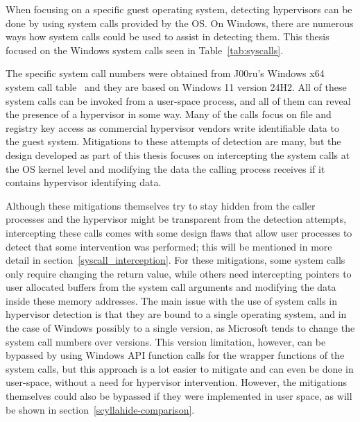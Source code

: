 When focusing on a specific guest operating system, detecting hypervisors can be done by using system calls provided by the OS. 
On Windows, there are numerous ways how system calls could be used to assist in detecting them. This thesis focused on the Windows system calls seen in Table~\ref{tab:syscalls}. 

The specific system call numbers were obtained from J00ru's Windows x64 system call table~\cite{j00ruSyscalls} and they are based on Windows 11 version 24H2. All of these system calls can be invoked from a user-space process, and all of them can reveal the presence of a hypervisor in some way. 
Many of the calls focus on file and registry key access as commercial hypervisor vendors write identifiable data to the guest system. 
Mitigations to these attempts of detection are many, but the design developed as part of this thesis focuses on intercepting the system calls at the OS kernel level 
and modifying the data the calling process receives if it contains hypervisor identifying data.

Although these mitigations themselves try to stay hidden from the caller processes and the hypervisor might be transparent from the detection attempts, intercepting these calls comes with some design flaws that allow user processes to detect that
some intervention was performed; this will be mentioned in more detail in section~\ref{syscall_interception}.
For these mitigations, some system calls only require changing the return value, while others need intercepting pointers to user allocated buffers from the system call arguments and modifying the data inside these memory addresses.
The main issue with the use of system calls in hypervisor detection is that they are bound to a single operating system, and in the case of Windows possibly to a single version, as Microsoft tends to change the system call numbers over versions.
This version limitation, however, can be bypassed by using Windows API function calls for the wrapper functions of the system calls, but this approach is a lot easier to mitigate and can even be done in user-space, without a need for hypervisor intervention.
However, the mitigations themselves could also be bypassed if they were implemented in user space, as will be shown in section~\ref{scyllahide-comparison}.

